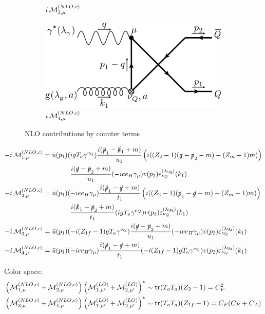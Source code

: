 \begin{figure}[ht!]
\begin{subfigure}[t]{.4\textwidth}
		\caption{$i\operatorname{\mathcal M}^{(NLO,c)}_{3,\mu}$}
	\end{subfigure}\hspace{.15\textwidth}%
	\begin{subfigure}[t]{.4\textwidth}
		\includegraphics[width=\textwidth]{pyfeyn/nlo-c-nuQcr}
		\caption{$i\operatorname{\mathcal M}^{(NLO,c)}_{4,\mu}$}
	\end{subfigure}
	\caption{NLO contributions by counter terms}\label{fig:FeynNLOvf}
\end{figure}

\begin{align}
-i\Md^{(NLO,c)}_{1,\mu} &=\bar u(p_1)(igT_a\gamma^{\nu_Q})\frac{i(\slashed{p}_1-\slashed{k}_1+m)}{u_1}\left(i((Z_2-1)(\slashed{q} - \slashed{p}_2- m) - (Z_m-1)m)\right)\nonumber\\
&\hspace{40pt}\frac{i(\slashed{q}-\slashed{p}_2+m)}{u_1}(-i e e_H \gamma_\mu)v(p_2)\varepsilon^{(\lambda_{\Pg})}_{\nu_Q}(k_1)\\
-i\Md^{(NLO,c)}_{2,\mu} &=\bar u(p_1)(-i e e_H \gamma_\mu)\frac{i(\slashed{p}_1-\slashed{q}+m)}{t_1}\left(i((Z_2-1)(\slashed{p}_1 - \slashed{q}- m) - (Z_m-1)m)\right)\nonumber\\
&\hspace{40pt}\frac{i(\slashed{k}_1-\slashed{p}_2+m)}{t_1}(igT_a\gamma^{\nu_Q})v(p_2)\varepsilon^{(\lambda_{\Pg})}_{\nu_Q}(k_1)\\
-i\Md^{(NLO,c)}_{3,\mu} &=\bar u(p_1)(-i(Z_{1f}-1)gT_a\gamma^{\nu_Q})\frac{i(\slashed{q}-\slashed{p}_2+m)}{u_1}(-i e e_H \gamma_\mu)v(p_2)\varepsilon^{(\lambda_{\Pg})}_{\nu_Q}(k_1)\\
-i\Md^{(NLO,c)}_{4,\mu} &=\bar u(p_1)(-i e e_H \gamma_\mu)\frac{i(\slashed{p}_1-\slashed{q}+m)}{t_1}(-i(Z_{1f}-1)gT_a\gamma^{\nu_Q})v(p_2)\varepsilon^{(\lambda_{\Pg})}_{\nu_Q}(k_1)
\end{align}

Color space:
\begin{align}
\left(\operatorname{\mathcal M}^{(NLO,c)}_{1,\mu}+\operatorname{\mathcal M}^{(NLO,c)}_{2,\mu}\right)\left(\operatorname{\mathcal M}^{(LO)}_{1,\mu'}+\operatorname{\mathcal M}^{(LO)}_{2,\mu'}\right)^*&\sim \operatorname{\text{tr}}(T_aT_a)(Z_2-1)=C_F^2\\
\left(\operatorname{\mathcal M}^{(NLO,c)}_{3,\mu}+\operatorname{\mathcal M}^{(NLO,c)}_{4,\mu}\right)\left(\operatorname{\mathcal M}^{(LO)}_{1,\mu'}+\operatorname{\mathcal M}^{(LO)}_{2,\mu'}\right)^*&\sim \operatorname{\text{tr}}(T_aT_a)(Z_{1f}-1)=C_F(C_F+C_A)
\end{align}
